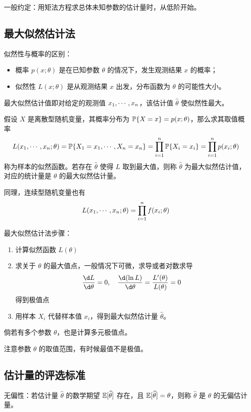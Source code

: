 一般约定：用矩法方程求总体未知参数的估计量时，从低阶开始。

\subsection{最大似然估计法}

似然性与概率的区别：
\begin{itemize}
	\item 概率 $p(x;\theta)$ 是在已知参数 $\theta$ 的情况下，发生观测结果 $x$ 的概率；
	\item 似然性 $L(x; \theta)$ 是从观测结果 $x$ 出发，分布函数为 $\theta$ 的可能性大小。
\end{itemize}

最大似然估计值即对给定的观测值 $x_1,\cdots,x_n$，该估计值 $\widehat{\theta}$ 使似然性最大。

假设 $X$ 是离散型随机变量，其概率分布为 $\mathbb{P}\{X = x\} = p(x; \theta)$，那么求其取值概率
\[ L(x_1,\cdots,x_n;\theta) = \mathbb{P}\{X_1 = x_1, \cdots, X_n = x_n\} = \prod_{i=1}^n \mathbb{P}\{X_i=x_i\} = \prod_{i=1}^n p(x_i; \theta) \]
称为样本的似然函数。若存在 $\widehat{\theta}$ 使得 $L$ 取到最大值，则称 $\widehat{\theta}$ 为最大似然估计值，对应的统计量是 $\theta$ 的最大似然估计量。

同理，连续型随机变量也有
\[ L(x_1,\cdots,x_n; \theta) = \prod_{i=1}^n f(x_i; \theta) \]

最大似然估计法步骤：
\begin{enumerate}
	\item 计算似然函数 $L(\theta)$
	\item 求关于 $\theta$ 的最大值点，一般情况下可微，求导或者对数求导
	      \[ \frac{\d L}{\d \theta} = 0, \quad \frac{\d (\ln L)}{\d \theta} = \frac{L'(\theta)}{L(\theta)} = 0 \]
	      得到极值点
	\item 用样本 $X_i$ 代替样本值 $x_i$，得到最大似然估计量 $\widehat{\theta}$。
\end{enumerate}
倘若有多个参数 $\theta$，也是计算多元极值点。

\begin{note}
	注意参数 $\theta$ 的取值范围，有时候最值不是极值。
\end{note}

\subsection{估计量的评选标准}

无偏性：若估计量 $\widehat{\theta}$ 的数学期望 $\mathbb{E}[\widehat{\theta}]$ 存在，且 $\mathbb{E}[\widehat{\theta}] = \theta$，则称 $\widehat{\theta}$ 是 $\theta$ 的无偏估计量。

